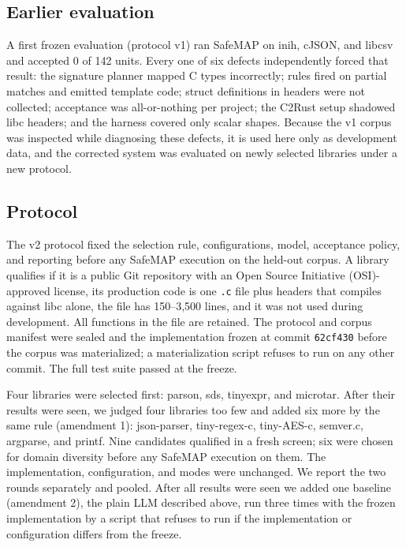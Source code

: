 \documentclass[pdflatex,sn-basic]{sn-jnl}
\newcommand{\tool}{SafeMAP\xspace}
\begin{document}
\subsection{Earlier evaluation}
\label{sec:history}

A first frozen evaluation (protocol v1) ran \tool on inih, cJSON, and libcsv
and accepted 0 of 142 units. Every one of six defects independently forced
that result: the signature planner mapped C types incorrectly; rules fired on
partial matches and emitted template code; struct definitions in headers were
not collected; acceptance was all-or-nothing per project; the C2Rust setup
shadowed libc headers; and the harness covered only scalar shapes. Because the
v1 corpus was inspected while diagnosing these defects, it is used here only
as development data, and the corrected system was evaluated on newly selected
libraries under a new protocol.

\subsection{Protocol}
\label{sec:protocol}

The v2 protocol fixed the selection rule, configurations, model, acceptance
policy, and reporting before any \tool execution on the held-out corpus. A
library qualifies if it is a public Git repository with an Open Source Initiative (OSI)-approved
license, its production code is one \texttt{.c} file plus headers that
compiles against libc alone, the file has 150--3,500 lines, and it was not
used during development. All functions in the file are retained. The protocol
and corpus manifest were sealed and the implementation frozen at commit
\texttt{62cf430} before the corpus was materialized; a materialization script
refuses to run on any other commit. The full test suite passed at the freeze.

Four libraries were selected first: parson, sds, tinyexpr, and microtar.
After their results were seen, we judged four libraries too few and added six
more by the same rule (amendment 1): json-parser, tiny-regex-c, tiny-AES-c,
semver.c, argparse, and printf. Nine candidates qualified in a fresh screen;
six were chosen for domain diversity before any \tool execution on them. The
implementation, configuration, and modes were unchanged. We report the two
rounds separately and pooled. After all results were seen we added one
baseline (amendment 2), the plain LLM described above, run three times with the
frozen implementation by a script that refuses to run if the implementation
or configuration differs from the freeze.
\end{document}
